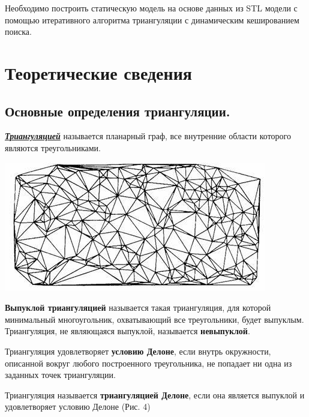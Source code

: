 \documentclass[a4paper, 12pt]{article}   	%
\begin{document}
    Необходимо построить статическую модель на основе данных из STL модели с помощью итеративного алгоритма триангуляции с динамическим кешированием поиска.
    
    

\newpage

\section{Теоретические сведения}
\subsection{Основные определения триангуляции.}


    \textit{\textbf{\underline{Триангуляцией}}} называется планарный граф, все внутренние области которого являются треугольниками. \cite{scvortsov}
    
    \begin{center}
        \begin{minipage}{0.7\linewidth}
            \includegraphics[width=\linewidth]{img/triangulation}
        \end{minipage}
    \end{center}
    
    \textbf{Выпуклой триангуляцией} называется такая триангуляция, для которой минимальный многоугольник, охватывающий все треугольники, будет выпуклым. Триангуляция, не являющаяся выпуклой, называется \textbf{невыпуклой}. \cite{scvortsov}
    
    Триангуляция удовлетворяет \textbf{условию Делоне}, если внутрь окружности, описанной вокруг любого построенного треугольника, не попадает ни одна из заданных точек триангуляции. \cite{scvortsov}
    
    Триангуляция называется \textbf{триангуляцией Делоне}, если она является выпуклой и удовлетворяет условию Делоне (Рис. 4)
    
\end{document}
